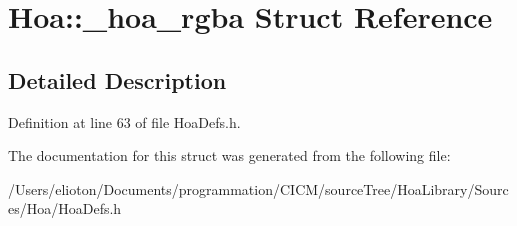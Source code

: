 \hypertarget{struct_hoa_1_1__hoa__rgba}{\section{Hoa\-:\-:\-\_\-hoa\-\_\-rgba Struct Reference}
\label{struct_hoa_1_1__hoa__rgba}
}


\subsection{Detailed Description}


Definition at line 63 of file Hoa\-Defs.\-h.



The documentation for this struct was generated from the following file\-:\begin{DoxyCompactItemize}
\item 
/\-Users/elioton/\-Documents/programmation/\-C\-I\-C\-M/source\-Tree/\-Hoa\-Library/\-Sources/\-Hoa/Hoa\-Defs.\-h\end{DoxyCompactItemize}

